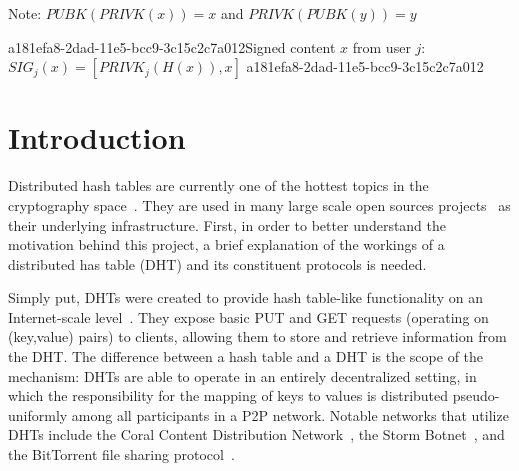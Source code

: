 \documentclass[12pt]{article}
\begin{document}
Note: $PUBK(PRIVK(x)) = x$ and $PRIVK(PUBK(y)) = y$~

a181efa8-2dad-11e5-bcc9-3c15c2c7a012Signed content $x$ from user $j$: $SIG_j(x) = \left[ PRIVK_j( H(x) ), x \right]$
a181efa8-2dad-11e5-bcc9-3c15c2c7a012
\section{Introduction}
\par Distributed hash tables are currently one of the hottest topics in the cryptography space~\cite{Stoica:2001dj,Rowstron:2001ea,Ratnasamy:2001wn}. They are used in many large scale open sources projects~\cite{Freitas:2013tb,Xu:2010vs,Perfitt:2010fh} as their underlying infrastructure. First, in order to better understand the motivation behind this project, a brief explanation of the workings of a distributed has table (DHT) and its constituent protocols is needed.

\par Simply put, DHTs were created to provide hash table-like functionality on an Internet-scale level~\cite{Ratnasamy:2001wn}. They expose basic PUT and GET requests (operating on (key,value) pairs) to clients, allowing them to store and retrieve information from the DHT. The difference between a hash table and a DHT is the scope of the mechanism: DHTs are able to operate in an entirely decentralized setting, in which the responsibility for the mapping of keys to values is distributed pseudo-uniformly among all participants in a P2P network. Notable networks that utilize DHTs include the Coral Content Distribution Network~\cite{Freedman:2004vb}, the Storm Botnet~\cite{Holz:2008uk}, and the BitTorrent file sharing protocol~\cite{Cohen:y1_8mBnw}.
\end{document}
